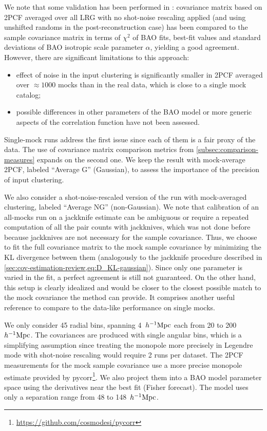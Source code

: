 We note that some validation has been performed in \cite{BAO.EDR.Moon.2023}: \rascalc{} covariance matrix based on 2PCF averaged over all LRG \themocks{} with no shot-noise rescaling applied (and using unshifted randoms in the post-reconstruction case) has been compared to the sample covariance matrix in terms of $\chi^2$ of BAO fits, best-fit values and standard deviations of BAO isotropic scale parameter $\alpha$, yielding a good agreement.
However, there are significant limitations to this approach:
\begin{itemize}
\item effect of noise in the input clustering is significantly smaller in 2PCF averaged over $\approx 1000$ mocks than in the real data, which is close to a single mock catalog;
\item possible differences in other parameters of the BAO model or more generic aspects of the correlation function have not been assessed.
\end{itemize}
Single-mock runs address the first issue since each of them is a fair proxy of the data.
The use of covariance matrix comparison metrics from \cref{subsec:comparison-measures} expands on the second one.
We keep the result with mock-average 2PCF, labeled ``Average G'' (Gaussian), to assess the importance of the precision of input clustering.

We also consider a shot-noise-rescaled version of the run with mock-averaged clustering, labeled ``Average NG'' (non-Gaussian).
We note that calibration of an all-mocks run on a jackknife estimate can be ambiguous or require a repeated computation of all the pair counts with jackknives, which was not done before because jackknives are not necessary for the sample covariance.
Thus, we choose to fit the full covariance matrix to the mock sample covariance by minimizing the KL divergence between them (analogously to the jackknife procedure described in \cref{sec:cov-estimation-review,eq:D_KL-gaussian}).
Since only one parameter is varied in the fit, a perfect agreement is still not guaranteed.
On the other hand, this setup is clearly idealized and would be closer to the closest possible match to the mock covariance the \rascalc{} method can provide.
It comprises another useful reference to compare to the data-like performance on single mocks.

We only consider 45 radial bins, spanning 4~$h^{-1}{\rm Mpc}$ each from 20 to 200~$h^{-1}{\rm Mpc}$.
The \rascalc{} covariances are produced with single angular bins, which is a simplifying assumption since treating the monopole more precisely in Legendre mode with shot-noise rescaling would require 2 runs per dataset. %
The 2PCF measurements for the mock sample covariance use a more precise monopole estimate provided by {\sc pycorr}\footnote{\url{https://github.com/cosmodesi/pycorr}}.
We also project them into a BAO model parameter space using the derivatives near the best fit (Fisher forecast).
The model uses only a separation range from 48 to 148~$h^{-1}{\rm Mpc}$.


